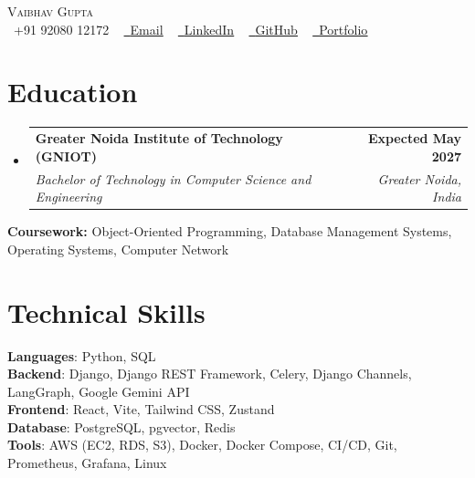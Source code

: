 \documentclass[letterpaper,10pt]{article}
\makeatletter
\newcommand{\resumeSubheading}[4]{
  \vspace{-2pt}\item
    \begin{tabular*}{1.0\textwidth}[t]{l@{\extracolsep{\fill}}r}
      \textbf{#1} & \textbf{\small #2} \\
      \textit{\small#3} & \textit{\small #4} \\
    \end{tabular*}\vspace{-7pt}
}
\newcommand{\resumeSubHeadingListStart}{\begin{itemize}[leftmargin=0.0in, label={}]}
\newcommand{\resumeSubHeadingListEnd}{\end{itemize}}
\makeatother
\begin{document}

\begin{center}
    {\Huge \scshape Vaibhav Gupta} \\ \vspace{1pt}
    \small \raisebox{-0.1\height}\faPhone\ +91 92080 12172 ~
    \href{mailto:vaibhv19.business@gmail.com}{\raisebox{-0.2\height}\faEnvelope\ \underline{Email}} ~
    \href{https://linkedin.com/in/vaibhv19}{\raisebox{-0.2\height}\faLinkedin\ \underline{LinkedIn}} ~
    \href{https://github.com/vaibhv19}{\raisebox{-0.2\height}\faGithub\ \underline{GitHub}} ~
    \href{https://vaibhv19.dev}{\raisebox{-0.2\height}\faGlobe\ \underline{Portfolio}}
    \vspace{-8pt}
\end{center}

\section{Education}
  \resumeSubHeadingListStart
    \resumeSubheading
      {Greater Noida Institute of Technology (GNIOT)}{Expected May 2027}
      {Bachelor of Technology in Computer Science and Engineering}{Greater Noida, India}
  \resumeSubHeadingListEnd
  \vspace{-4pt}
  \begin{itemize}[leftmargin=0in, label={}]
    \small{\item{\textbf{Coursework:} Object-Oriented Programming, Database Management Systems, Operating Systems, Computer Network}}
    \vspace{-10pt}
\end{itemize}

\section{Technical Skills}
 \begin{itemize}[leftmargin=0in, label={}]
    \small{\item{
     \textbf{Languages}{: Python, SQL} \\
     \textbf{Backend}{: Django, Django REST Framework, Celery, Django Channels, LangGraph, Google Gemini API} \\
     \textbf{Frontend}{: React, Vite, Tailwind CSS, Zustand} \\
     \textbf{Database}{: PostgreSQL, pgvector, Redis} \\
     \textbf{Tools}{: AWS (EC2, RDS, S3), Docker, Docker Compose, CI/CD, Git, Prometheus, Grafana, Linux} \\
    }}
 \end{itemize}
 \vspace{-12pt}
\end{document}
